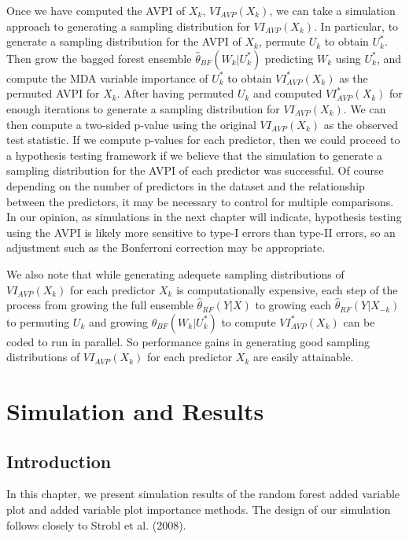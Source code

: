 \documentclass[12pt,twoside]{reedthesis}
\theoremstyle{definition}
\theoremstyle{definition}
\theoremstyle{definition}
\theoremstyle{remark}
\begin{document}
Once we have computed the AVPI of \(X_k\), \(VI_{AVP}(X_k)\), we can
take a simulation approach to generating a sampling distribution for
\(VI_{AVP}(X_k)\). In particular, to generate a sampling distribution
for the AVPI of \(X_k\), permute \(U_k\) to obtain \(U_k^*\). Then grow
the bagged forest ensemble \(\hat{\theta}_{BF}(W_k|U_k^*)\) predicting
\(W_k\) using \(U_k^*\), and compute the MDA variable importance of
\(U_k^*\) to obtain \(VI_{AVP}^*(X_k)\) as the permuted AVPI for
\(X_k\). After having permuted \(U_k\) and computed \(VI_{AVP}^*(X_k)\)
for enough iterations to generate a sampling distribution for
\(VI_{AVP}(X_k)\). We can then compute a two-sided p-value using the
original \(VI_{AVP}(X_k)\) as the observed test statistic. If we compute
p-values for each predictor, then we could proceed to a hypothesis
testing framework if we believe that the simulation to generate a
sampling distribution for the AVPI of each predictor was successful. Of
course depending on the number of predictors in the dataset and the
relationship between the predictors, it may be necessary to control for
multiple comparisons. In our opinion, as simulations in the next chapter
will indicate, hypothesis testing using the AVPI is likely more
sensitive to type-I errors than type-II errors, so an adjustment such as
the Bonferroni correction may be appropriate. \par

We also note that while generating adequete sampling distributions of
\(VI_{AVP}(X_k)\) for each predictor \(X_k\) is computationally
expensive, each step of the process from growing the full ensemble
\(\hat{\theta}_{RF}(Y|X)\) to growing each
\(\hat{\theta}_{RF}(Y|X_{-k})\) to permuting \(U_k\) and growing
\(\hat{\theta}_{BF}(W_k|U_k^*)\) to compute \(VI_{AVP}^*(X_k)\) can be
coded to run in parallel. So performance gains in generating good
sampling distributions of \(VI_{AVP}(X_k)\) for each predictor \(X_k\)
are easily attainable. \par

\chapter{Simulation and Results}\label{simulation-and-results}

\section{Introduction}\label{introduction-3}

In this chapter, we present simulation results of the random forest
added variable plot and added variable plot importance methods. The
design of our simulation follows closely to Strobl et al. (2008). \par
\end{document}
